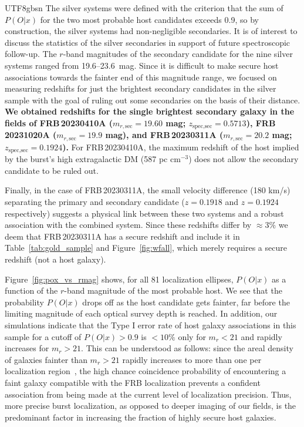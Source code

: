 \documentclass[twocolumn,linenumbers]{aastex631}
\newcommand{\msbold}[1]{\textbf{#1}}
\begin{document}
\begin{CJK*}{UTF8}{gbsn}
The silver systems were defined with the criterion that the sum of $P(O|x)$ for the two most probable host candidates exceeds 0.9, so by construction, the silver systems had non-negligible secondaries. It is of interest to discuss the statistics of the silver secondaries in support of future spectroscopic follow-up. The $r$-band magnitudes of the secondary candidate for the nine silver systems ranged from 19.6--23.6~mag. Since it is difficult to make secure host associations towards the fainter end of this magnitude range, we focused on measuring redshifts for just the brightest secondary candidates in the silver sample with the goal of ruling out some secondaries on the basis of their distance. \msbold{We obtained redshifts for the single brightest secondary galaxy in the fields of FRB\,20230410A ($m_{r,\textrm{sec}} = 19.60$ mag; $z_\textrm{spec,sec} = 0.5713$),
FRB\,20231020A ($m_{r,\textrm{sec}} = 19.9$ mag), and FRB\,20230311A ($m_{r,\textrm{sec}} = 20.2$ mag; $z_\textrm{spec,sec} = 0.1924$).} For FRB\,20230410A, the maximum redshift of the host implied by the burst's high extragalactic DM (587 pc cm$^{-3}$) does not allow the secondary candidate to be ruled out. 

Finally, in the case of FRB\,20230311A, the small velocity difference (180 km/s) separating the primary and secondary candidate ($z=0.1918$ and $z=0.1924$ respectively) suggests a physical link between these two systems and a robust association with the combined system. Since these redshifts differ by $\approx 3\%$ we deem that FRB\,20230311A has a secure redshift and include it in Table~\ref{tab:gold_sample} and Figure~\ref{fig:wfall}, which merely requires a secure redshift (not a host galaxy).

Figure~\ref{fig:pox_vs_rmag} shows, for all 81 localization ellipses, $P(O|x)$ as a function of the $r$-band magnitude of the most probable host. We see that the probability $P(O|x)$ drops off as the host candidate gets fainter, far before the limiting magnitude of each optical survey depth is reached. In addition, our simulations indicate that the Type I error rate of host galaxy associations in this sample for a cutoff of $P(O|x) > 0.9$ is $<10\%$ only for $m_r < 21$ and rapidly increases for $m_r > 21$. This can be understood as follows: since the areal density of galaxies fainter than $m_r > 21$ rapidly increases to more than one per localization region~\citep{driver2016galaxy,eftekhari2017associating}, the high chance coincidence probability of encountering a faint galaxy compatible with the FRB localization prevents a confident association from being made at the current level of localization precision. Thus, more precise burst localization, as opposed to deeper imaging of our fields, is the predominant factor in increasing the fraction of highly secure host galaxies. 


\end{CJK*}
\end{document}
